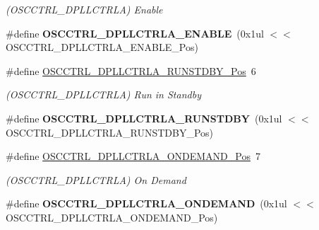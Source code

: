 \begin{DoxyCompactItemize}
\begin{DoxyCompactList}\small\item\em (O\+S\+C\+C\+T\+R\+L\+\_\+\+D\+P\+L\+L\+C\+T\+R\+L\+A) Enable \end{DoxyCompactList}\item 
\hypertarget{group___s_a_m_l21___o_s_c_c_t_r_l_gab46aa042b8931d98092b639f29a70df5}{}\#define {\bfseries O\+S\+C\+C\+T\+R\+L\+\_\+\+D\+P\+L\+L\+C\+T\+R\+L\+A\+\_\+\+E\+N\+A\+B\+L\+E}~(0x1ul $<$$<$ O\+S\+C\+C\+T\+R\+L\+\_\+\+D\+P\+L\+L\+C\+T\+R\+L\+A\+\_\+\+E\+N\+A\+B\+L\+E\+\_\+\+Pos)\label{group___s_a_m_l21___o_s_c_c_t_r_l_gab46aa042b8931d98092b639f29a70df5}

\item 
\hypertarget{group___s_a_m_l21___o_s_c_c_t_r_l_gafef60db26a0859cab97dfc76903c6156}{}\#define \hyperlink{group___s_a_m_l21___o_s_c_c_t_r_l_gafef60db26a0859cab97dfc76903c6156}{O\+S\+C\+C\+T\+R\+L\+\_\+\+D\+P\+L\+L\+C\+T\+R\+L\+A\+\_\+\+R\+U\+N\+S\+T\+D\+B\+Y\+\_\+\+Pos}~6\label{group___s_a_m_l21___o_s_c_c_t_r_l_gafef60db26a0859cab97dfc76903c6156}

\begin{DoxyCompactList}\small\item\em (O\+S\+C\+C\+T\+R\+L\+\_\+\+D\+P\+L\+L\+C\+T\+R\+L\+A) Run in Standby \end{DoxyCompactList}\item 
\hypertarget{group___s_a_m_l21___o_s_c_c_t_r_l_gab57aa112a5cb1ff3068d8a15d5b35a9a}{}\#define {\bfseries O\+S\+C\+C\+T\+R\+L\+\_\+\+D\+P\+L\+L\+C\+T\+R\+L\+A\+\_\+\+R\+U\+N\+S\+T\+D\+B\+Y}~(0x1ul $<$$<$ O\+S\+C\+C\+T\+R\+L\+\_\+\+D\+P\+L\+L\+C\+T\+R\+L\+A\+\_\+\+R\+U\+N\+S\+T\+D\+B\+Y\+\_\+\+Pos)\label{group___s_a_m_l21___o_s_c_c_t_r_l_gab57aa112a5cb1ff3068d8a15d5b35a9a}

\item 
\hypertarget{group___s_a_m_l21___o_s_c_c_t_r_l_gad9e01b631ceb9a9cd32ae5bc6e0f0483}{}\#define \hyperlink{group___s_a_m_l21___o_s_c_c_t_r_l_gad9e01b631ceb9a9cd32ae5bc6e0f0483}{O\+S\+C\+C\+T\+R\+L\+\_\+\+D\+P\+L\+L\+C\+T\+R\+L\+A\+\_\+\+O\+N\+D\+E\+M\+A\+N\+D\+\_\+\+Pos}~7\label{group___s_a_m_l21___o_s_c_c_t_r_l_gad9e01b631ceb9a9cd32ae5bc6e0f0483}

\begin{DoxyCompactList}\small\item\em (O\+S\+C\+C\+T\+R\+L\+\_\+\+D\+P\+L\+L\+C\+T\+R\+L\+A) On Demand \end{DoxyCompactList}\item 
\hypertarget{group___s_a_m_l21___o_s_c_c_t_r_l_ga837a5abb577215cc9388d6b27852c374}{}\#define {\bfseries O\+S\+C\+C\+T\+R\+L\+\_\+\+D\+P\+L\+L\+C\+T\+R\+L\+A\+\_\+\+O\+N\+D\+E\+M\+A\+N\+D}~(0x1ul $<$$<$ O\+S\+C\+C\+T\+R\+L\+\_\+\+D\+P\+L\+L\+C\+T\+R\+L\+A\+\_\+\+O\+N\+D\+E\+M\+A\+N\+D\+\_\+\+Pos)\label{group___s_a_m_l21___o_s_c_c_t_r_l_ga837a5abb577215cc9388d6b27852c374}


\end{DoxyCompactItemize}
